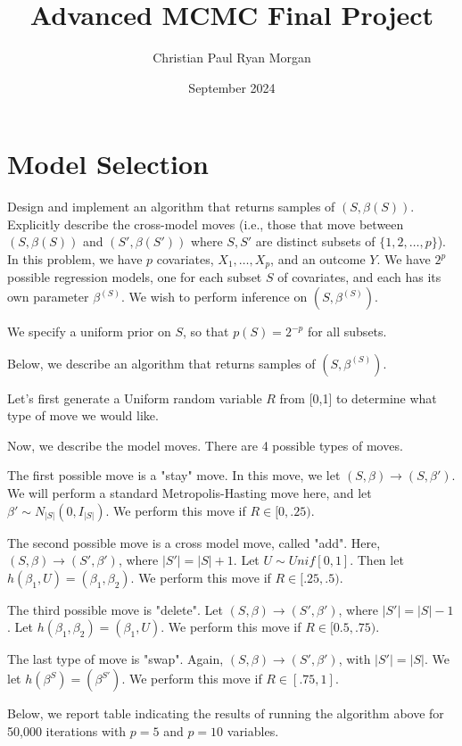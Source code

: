 \documentclass{article}
\title{Advanced MCMC Final Project}
\author{Christian Paul Ryan Morgan }
\date{September 2024}
\begin{document}
\maketitle

\section{Model Selection} 
Design and implement an algorithm that returns samples of $(S, \beta(S))$. Explicitly describe the cross-model moves (i.e., those that move between $(S, \beta(S))$ and $(S', \beta(S'))$ where $S, S'$ are distinct subsets of $\{1, 2, \dots, p\}$). \\ 


In this problem, we have $p$ covariates, $X_1, \ldots, X_p$, and an outcome $Y$. We have $2^p$ possible regression models, one for each subset $S$ of covariates, and each has its own parameter $\beta^{(S)}$. We wish to perform inference on $(S, \beta^{(S)})$.

We specify a uniform prior on $S$, so that $p(S) = 2^{-p}$ for all subsets.

Below, we describe an algorithm that returns samples of $(S, \beta^{(S)})$.

Let's first generate a Uniform random variable $R$ from [0,1] to determine what type of move we would like.

Now, we describe the model moves. There are 4 possible types of moves. 

The first possible move is a "stay" move. In this move, we let $(S, \beta) \to (S, \beta')$. We will perform a standard Metropolis-Hasting move here, and let $\beta' \sim N_{|S|}(0, I_{|S|})$. We perform this move if $R \in [0, .25)$.

The second possible move is a cross model move, called "add". Here, $(S, \beta) \to (S', \beta')$, where $|S'| = |S|+1$. Let $U \sim Unif[0,1]$. Then let $h(\beta_1, U) = (\beta_1, \beta_2)$. We perform this move if $R \in [.25, .5)$.

The third possible move is "delete". Let $(S, \beta) \to (S', \beta')$, where $|S'| = |S| - 1$. Let $h(\beta_1, \beta_2) = (\beta_1, U)$. We perform this move if $R \in [0.5, .75)$.

The last type of move is "swap". Again, $(S, \beta) \to (S', \beta')$, with $|S'| = |S|$. We let $h(\beta^S) = (\beta^{S'})$. We perform this move if $R \in [.75, 1]$.


Below, we report table indicating the results of running the algorithm above for 50,000 iterations with $p=5$ and $p=10$ variables.
\end{document}
